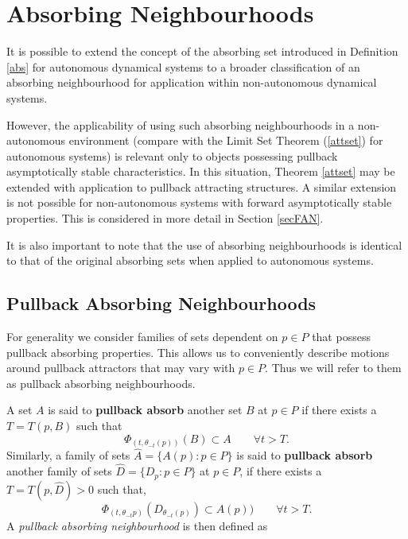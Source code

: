 
\section{Absorbing Neighbourhoods}
\label{ANsec}

It is possible to extend the concept of the absorbing set introduced in
Definition \ref{abs} for autonomous dynamical systems to a broader
classification of an absorbing neighbourhood for application within
non-autonomous dynamical systems.

However, the applicability of using such absorbing neighbourhoods
in a non-autonomous environment (compare with the Limit Set
Theorem (\ref{attset}) for autonomous systems) is relevant only to
objects possessing pullback asymptotically stable characteristics.
In this situation, Theorem \ref{attset} may be extended with
application to pullback attracting structures. A similar extension
is not possible for non-autonomous systems with forward
asymptotically stable properties. This is considered in more
detail in Section \ref{secFAN}.

It is also important to note that the use of absorbing neighbourhoods
is identical to that of the original absorbing sets when applied to autonomous
systems.

\subsection{Pullback Absorbing Neighbourhoods}

For generality we consider families of sets dependent on $p \in P$ that possess
pullback absorbing properties. This allows us to conveniently describe
motions around pullback attractors that may vary with $p \in P$. Thus we
will refer to them as pullback absorbing neighbourhoods.

A set $A$ is said to {\bf pullback absorb} another set
$B$ at $p \in P$ if there exists a $T = T(p,B)$ such that
\[ \Phi_{(t, \theta_{-t}(p))}(B) \subset A \qquad \forall t > T. \]
Similarly, a family of sets $\hat{A} = \{A(p):p \in P \}$ is
said to {\bf pullback absorb} another family of sets $\hat{D} = \{D_p:p \in
P\}$ at $p \in P$, if there exists a $T=T(p,\hat{D}) >0$ such that,
\[ \Phi_{(t,\theta_{-t}p)}(D_{\theta_{-t}(p)}) \subset A(p)) \qquad
             \forall t > T. \]
A {\em pullback absorbing neighbourhood} is then defined as

